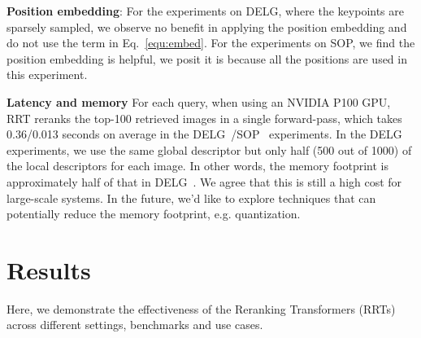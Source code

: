 \textbf{Position embedding}:
For the experiments on DELG, where the keypoints are sparsely sampled, we observe no benefit in applying the position embedding and do not use the  term in Eq.~\ref{equ:embed}. For the experiments on SOP, we find the position embedding is helpful, we posit it is because all the positions are used in this experiment. 

\textbf{Latency and memory}
For each query, when using an NVIDIA P100 GPU, RRT reranks the top-100 retrieved images in a single forward-pass, which takes 0.36/0.013 seconds on average in the DELG~\cite{delg2020}/SOP~\cite{sop2016} experiments.
In the DELG experiments, we use the same global descriptor but only half (500 out of 1000) of the local descriptors for each image.
In other words, the memory footprint is approximately half of that in DELG~\cite{delg2020}. 
We agree that this is still a high cost for large-scale systems. 
In the future, we'd like to explore techniques that can potentially reduce the memory footprint, e.g. quantization.

\section{Results}
Here, we demonstrate the effectiveness of the Reranking Transformers (RRTs) across different settings, benchmarks and use cases.

